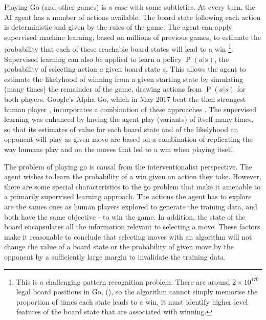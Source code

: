 \documentclass[11pt,a4paper,oneside]{book}
\renewcommand{\P}[1]{\operatorname{P}\left(#1\right)}
\theoremstyle{plain}
\theoremstyle{definition}
\begin{document}
Playing Go (and other games) is a case with some subtleties. At every turn, the AI agent has a number of actions available. The board state following each action is deterministic and given by the rules of the game. The agent can apply supervised machine learning, based on millions of previous games, to estimate the probability that each of these reachable board states will lead to a win \footnote{This is a challenging pattern recognition problem. There are around $2 \times 10^{170}$ legal board positions in Go, (\citep{tromp2016number}), so the algorithm cannot simply memorise the proportion of times each state leads to a win, it must identify higher level features of the board state that are associated with winning.}. Supervised learning can also be applied to learn a policy $\P{a|s}$, the probability of selecting action $a$ given board state $s$. This allows the agent to estimate the likelyhood of winning from a given starting state by simulating (many times) the remainder of the game, drawing actions from $\P{a|s}$ for both players. Google's Alpha Go, which in May 2017 beat the then strongest human player \citep{Mozur2017}, incorporates a combination of these approaches \citep{silver2016mastering}. The supervised learning was enhanced by having the agent play (variants) of itself many times, so that its estimates of value for each board state and of the likelyhood an opponent will play as given move are based on a combination of replicating the way humans play and on the moves that led to a win when playing itself. 

The problem of playing go is causal from the interventionalist perspective. The agent wishes to learn the probability of a win given an action they take. However, there are some special characteristics to the go problem that make it amenable to a primarily supervised learning approach. The actions the agent has to explore are the sames ones as human players explored to generate the training data, and both have the same objective - to win the game. In addition, the state of the board encapsulates all the information relevant to selecting a move. These factors make it reasonable to conclude that selecting moves with an algorithm will not change the value of a board state or the probability of given move by the opponent by a sufficiently large margin to invalidate the training data. 
 
\end{document}
